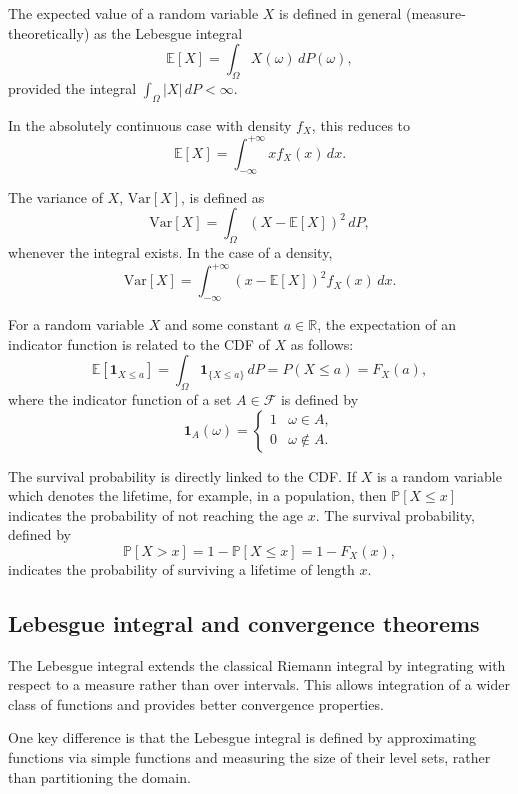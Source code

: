 \par
The expected value of a random variable $X$ is defined in general (measure-theoretically) as the Lebesgue integral
\[
\mathbb{E}[X] = \int_{\Omega} X(\omega)\, dP(\omega),
\]
provided the integral $\int_{\Omega} |X|\, dP < \infty$.

\par
In the absolutely continuous case with density $f_X$, this reduces to
\[
\mathbb{E}[X] = \int_{-\infty}^{+\infty} x f_X(x)\, dx.
\]

\par
The variance of $X$, $\mathrm{Var}[X]$, is defined as
\[
\mathrm{Var}[X] = \int_{\Omega} (X - \mathbb{E}[X])^2\, dP,
\]
whenever the integral exists. In the case of a density,
\[
\mathrm{Var}[X] = \int_{-\infty}^{+\infty} (x - \mathbb{E}[X])^2 f_X(x)\, dx.
\]

\par
For a random variable $X$ and some constant $a \in \mathbb{R}$, the expectation of an indicator function is related to the CDF of $X$ as follows:
\[
\mathbb{E}[\mathbf{1}_{X \leq a}] = \int_{\Omega} \mathbf{1}_{\{X \leq a\}}\, dP = P(X \leq a) = F_X(a),
\]
where the indicator function of a set $A \in \mathcal{F}$ is defined by
\[
\mathbf{1}_A(\omega) = 
\begin{cases} 
1 & \omega \in A, \\
0 & \omega \notin A. 
\end{cases}
\]

\begin{definition}
The survival probability is directly linked to the CDF. If $X$ is a random variable which denotes the lifetime, for example, in a population, then $\mathbb{P}[X \leq x]$ indicates the probability of not reaching the age $x$. The survival probability, defined by
\[
\mathbb{P}[X > x] = 1 - \mathbb{P}[X \leq x] = 1 - F_X(x),
\]
indicates the probability of surviving a lifetime of length $x$.
\end{definition}
\subsection{Lebesgue integral and convergence theorems}

The Lebesgue integral extends the classical Riemann integral by integrating with respect to a measure rather than over intervals. This allows integration of a wider class of functions and provides better convergence properties.

\par
One key difference is that the Lebesgue integral is defined by approximating functions via simple functions and measuring the size of their level sets, rather than partitioning the domain.

